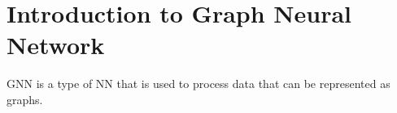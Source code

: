 
\section{Introduction to Graph Neural Network}
GNN is a type of NN that is used to process data that can be represented as graphs.









